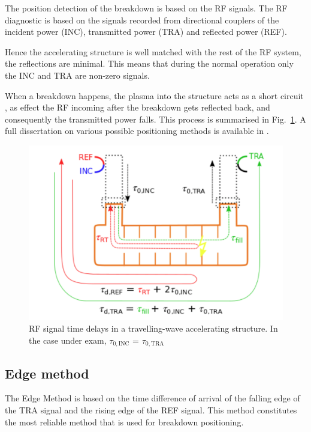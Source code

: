 The position detection of the breakdown is based on the RF signals. The RF diagnostic is based on the signals recorded from directional couplers of the incident power (INC), transmitted power (TRA) and reflected power (REF). 

Hence the accelerating structure is well matched with the rest of the RF system, the reflections are minimal. This means that during the normal operation only the INC and TRA are non-zero signals.

When a breakdown happens, the plasma into the structure acts as a short circuit \cite{Degiovanni:2025952}, as effect the RF incoming after the breakdown gets reflected back, and consequently the transmitted power falls. This process is summarised in Fig.~\ref{BD_scheme}. A full dissertation on various possible positioning methods is available in \cite{Rajamaki:2143815}.

\begin{figure}[h]
\centering 
\includegraphics[scale=0.3]{pictures/structure_scheme}
\caption{RF signal time delays in a travelling-wave accelerating structure. In the case under exam, $\tau_{0,\text{INC}}$ = $\tau_{0,\text{TRA}}$}
\label{BD_scheme}
\end{figure}


\subsection[Edge method]{Edge method}

The Edge Method is based on the time difference of arrival of the falling edge of the TRA signal and the rising edge of the REF signal. This method constitutes the most reliable method that is used for breakdown positioning. 

